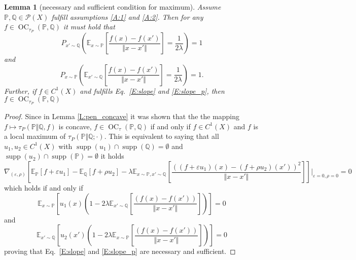 \documentclass{article}
\DeclareMathOperator{\supp}{supp}
\DeclareMathOperator{\oc}{OC}
\newtheorem{lemma}{Lemma}
\begin{document}
\begin{lemma}[necessary and sufficient condition for maximum]\label{L:necessary_for_maximum}
  Assume $\mathbb P,\mathbb Q\in\mathcal P(X)$ fulfill assumptions \ref{A:1} and \ref{A:2}. Then for any $f\in \oc_{\tau_P}(\mathbb P,\mathbb Q)$ it must hold that
  \begin{equation}\label{E:slope}
  P_{x'\sim\mathbb Q}\left(\mathbb E_{x\sim\mathbb P}\left[\frac{f(x)-f(x')}{\Vert x-x'\Vert}\right] = \frac{1}{2\lambda}\right)=1
  \end{equation}
  and
  \begin{equation}\label{E:slope_p}
  P_{x\sim\mathbb P}\left(\mathbb E_{x'\sim\mathbb Q}\left[\frac{f(x)-f(x')}{\Vert x-x'\Vert}\right] = \frac{1}{2\lambda}\right)=1.
  \end{equation}
  Further, if $f\in C^1(X)$ and fulfills Eq.\ \ref{E:slope} and \ref{E:slope_p}, then $f\in \oc_{\tau_P}(\mathbb P,\mathbb Q)$
 \end{lemma}

 \begin{proof}
  Since in Lemma \ref{L:pen_concave} it was shown that the the mapping $f\mapsto\tau_P(\mathbb P\Vert\mathbb Q,f)$ is concave,
  $f\in\oc_\tau(\mathbb P,\mathbb Q)$ if and only if  $f\in C^1(X)$ and $f$ is a local maximum of $\tau_P(\mathbb P\Vert\mathbb Q;\cdot)$.
  This is equivalent to saying that all $u_1,u_2\in C^1(X)$ with $\supp(u_1)\cap\supp(\mathbb Q)=\emptyset$ and $\supp(u_2)\cap\supp(\mathbb P)=\emptyset$ it holds
  \[\nabla_{(\varepsilon,\rho)}\left[\mathbb E_{\mathbb P}[f+\varepsilon u_1]-\mathbb E_{\mathbb Q}[f+\rho u_2]
  -\lambda\mathbb E_{x\sim\mathbb P,x'\sim\mathbb Q}\left[\frac{((f+\varepsilon u_1)(x)-(f+\rho u_2)(x'))^2}{\Vert x-x'\Vert}\right]\right]
  \bigg|_{\varepsilon=0,\rho=0}=0\]
  which holds if and only if
  \[\mathbb E_{x\sim\mathbb P}\left[u_1(x)\left(1-2\lambda\mathbb E_{x'\sim\mathbb Q}\left[\frac{(f(x)-f(x'))}{\Vert x-x'\Vert}\right]\right)\right]=0\]
  and
  \[\mathbb E_{x'\sim\mathbb Q}\left[u_2(x')\left(1-2\lambda\mathbb E_{x\sim\mathbb P}\left[\frac{(f(x)-f(x'))}{\Vert x-x'\Vert}\right]\right)\right]=0\]
  proving that Eq.\ \ref{E:slope} and \ref{E:slope_p} are necessary and sufficient.
 \end{proof}
\end{document}

